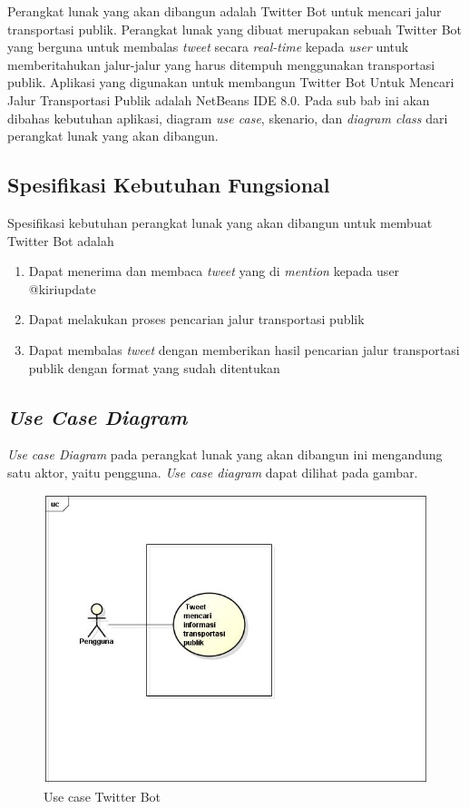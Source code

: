 Perangkat lunak yang akan dibangun adalah Twitter Bot untuk mencari jalur transportasi publik. Perangkat lunak yang dibuat merupakan sebuah Twitter Bot yang berguna untuk membalas \textit{tweet} secara \textit{real-time} kepada \textit{user} untuk memberitahukan jalur-jalur yang harus ditempuh menggunakan transportasi publik. Aplikasi yang digunakan untuk membangun Twitter Bot Untuk Mencari Jalur Transportasi Publik adalah NetBeans IDE 8.0. Pada sub bab ini akan dibahas kebutuhan aplikasi, diagram \textit{use case}, skenario, dan\textit{ diagram class} dari perangkat lunak yang akan dibangun.

\subsection{Spesifikasi Kebutuhan Fungsional}
Spesifikasi kebutuhan perangkat lunak yang akan dibangun untuk membuat Twitter Bot adalah
\begin{enumerate}
	\item Dapat menerima dan membaca \textit{tweet} yang di \textit{mention} kepada user @kiriupdate
	\item Dapat melakukan proses pencarian jalur transportasi publik
	\item Dapat membalas \textit{tweet} dengan memberikan hasil pencarian jalur transportasi publik dengan format yang sudah ditentukan
\end{enumerate}

\subsection{\textit{Use Case Diagram}}
\textit{Use case Diagram} pada perangkat lunak yang akan dibangun ini mengandung satu aktor, yaitu pengguna. \textit{Use case diagram} dapat dilihat pada gambar.

\begin{figure}[htbp]
	\centering
		\includegraphics{Gambar/usecase.jpg}
	\caption{Use case Twitter Bot}
	\label{fig:usecase}
\end{figure}

